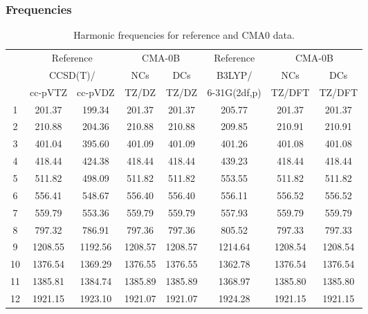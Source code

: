 \documentclass[10pt,oneside]{article}
\begin{document}
\subsubsection*{Frequencies}
\begin{table}[h!]
\centering
\caption{Harmonic frequencies for reference and CMA0 data.}
\begin{tabular}{cccccccc}
\toprule
{} & \multicolumn{2}{c}{Reference} & \multicolumn{2}{c}{CMA-0B} &    Reference & \multicolumn{2}{c}{CMA-0B} \\
{} & \multicolumn{2}{c}{CCSD(T)/} &     NCs &     DCs &       B3LYP/ &     NCs &     DCs \\
{} &   cc-pVTZ & cc-pVDZ &   TZ/DZ &   TZ/DZ & 6-31G(2df,p) &  TZ/DFT &  TZ/DFT \\
\midrule
1  &    201.37 &  199.34 &  201.37 &  201.37 &       205.77 &  201.37 &  201.37 \\
2  &    210.88 &  204.36 &  210.88 &  210.88 &       209.85 &  210.91 &  210.91 \\
3  &    401.04 &  395.60 &  401.09 &  401.09 &       401.26 &  401.08 &  401.08 \\
4  &    418.44 &  424.38 &  418.44 &  418.44 &       439.23 &  418.44 &  418.44 \\
5  &    511.82 &  498.09 &  511.82 &  511.82 &       553.55 &  511.82 &  511.82 \\
6  &    556.41 &  548.67 &  556.40 &  556.40 &       556.11 &  556.52 &  556.52 \\
7  &    559.79 &  553.36 &  559.79 &  559.79 &       557.93 &  559.79 &  559.79 \\
8  &    797.32 &  786.91 &  797.36 &  797.36 &       805.52 &  797.33 &  797.33 \\
9  &   1208.55 & 1192.56 & 1208.57 & 1208.57 &      1214.64 & 1208.54 & 1208.54 \\
10 &   1376.54 & 1369.29 & 1376.55 & 1376.55 &      1362.78 & 1376.54 & 1376.54 \\
11 &   1385.81 & 1384.74 & 1385.89 & 1385.89 &      1368.97 & 1385.80 & 1385.80 \\
12 &   1921.15 & 1923.10 & 1921.07 & 1921.07 &      1924.28 & 1921.15 & 1921.15 \\
\bottomrule
\end{tabular}
\end{table}

\clearpage
\end{document}
